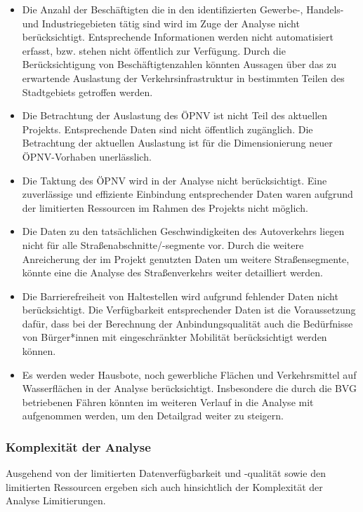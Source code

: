 \begin{itemize}

    \item Die Anzahl der Beschäftigten die in den identifizierten Gewerbe-, Handels- und Industriegebieten tätig sind wird im Zuge der Analyse nicht berücksichtigt. Entsprechende Informationen werden nicht automatisiert erfasst, bzw. stehen nicht öffentlich zur Verfügung. Durch die Berücksichtigung von Beschäftigtenzahlen könnten Aussagen über das zu erwartende Auslastung der Verkehrsinfrastruktur in bestimmten Teilen des Stadtgebiets getroffen werden.

    \item Die Betrachtung der Auslastung des ÖPNV ist nicht Teil des aktuellen Projekts. Entsprechende Daten sind nicht öffentlich zugänglich. Die Betrachtung der aktuellen Auslastung ist für die Dimensionierung neuer ÖPNV-Vorhaben unerlässlich.

    \item Die Taktung des ÖPNV wird in der Analyse nicht berücksichtigt​. Eine zuverlässige und effiziente Einbindung entsprechender Daten waren aufgrund der limitierten Ressourcen im Rahmen des Projekts nicht möglich.

    \item Die Daten zu den tatsächlichen Geschwindigkeiten des Autoverkehrs liegen nicht für alle Straßenabschnitte/-segmente vor​. Durch die weitere Anreicherung der im Projekt genutzten Daten um weitere Straßensegmente, könnte eine die Analyse des Straßenverkehrs weiter detailliert werden.

    \item Die Barrierefreiheit von Haltestellen wird aufgrund fehlender Daten nicht berücksichtigt​. Die Verfügbarkeit entsprechender Daten ist die Voraussetzung dafür, dass bei der Berechnung der Anbindungsqualität auch die Bedürfnisse von Bürger*innen mit eingeschränkter Mobilität berücksichtigt werden können.

    \item Es werden weder Hausbote, noch gewerbliche Flächen und Verkehrsmittel auf Wasserflächen in der Analyse berücksichtigt. Insbesondere die durch die BVG betriebenen Fähren könnten im weiteren Verlauf in die Analyse mit aufgenommen werden, um den Detailgrad weiter zu steigern.

\end{itemize}

\subsubsection{Komplexität der Analyse}
Ausgehend von der limitierten Datenverfügbarkeit und -qualität sowie den limitierten Ressourcen ergeben sich auch hinsichtlich der Komplexität der Analyse Limitierungen.

